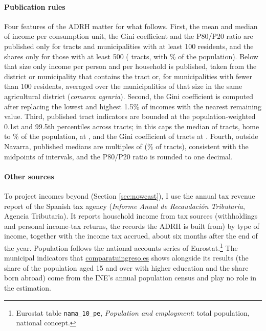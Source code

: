 \paragraph{Publication rules} Four features of the ADRH matter for what follows. First, the mean and median of income per consumption unit, the Gini coefficient and the P80/P20 ratio are published only for tracts and municipalities with at least 100 residents, and the shares only for those with at least 500 (\ShareTracts{} tracts, with \ShareTractsPopPct{}\% of the population). Below that size only income per person and per household is published, taken from the district or municipality that contains the tract or, for municipalities with fewer than 100 residents, averaged over the municipalities of that size in the same agricultural district (\textit{comarca agraria}). Second, the Gini coefficient is computed after replacing the lowest and highest 1.5\% of incomes with the nearest remaining value. Third, published tract indicators are bounded at the population-weighted 0.1st and 99.5th percentiles across tracts; in \BaseYear{} this caps the median of \CapTracts{} tracts, home to \CapPopPct{}\% of the population, at \texteuro\CapMedian{}, and the Gini coefficient of \CapGiniTracts{} tracts at \CapGini{}. Fourth, outside Navarra, published medians are multiples of  (\MedBinnedPct{}\% of tracts), consistent with the midpoints of  intervals, and the P80/P20 ratio is rounded to one decimal.

\paragraph{Other sources} To project incomes beyond \BaseYear{} (Section \ref{sec:nowcast}), I use the annual tax revenue report of the Spanish tax agency (\textit{Informe Anual de Recaudación Tributaria}, Agencia Tributaria). It reports household income from tax sources (withholdings and personal income-tax returns, the records the ADRH is built from) by type of income, together with the income tax accrued, about six months after the end of the year. Population follows the national accounts series of Eurostat.\footnote{Eurostat table \texttt{nama\_10\_pe}, \textit{Population and employment}: total population, national concept.} The municipal indicators that \href{https://comparatuingreso.es/}{\mbox{comparatuingreso.es}} shows alongside its results (the share of the population aged 15 and over with higher education and the share born abroad) come from the INE's annual population census and play no role in the estimation.


